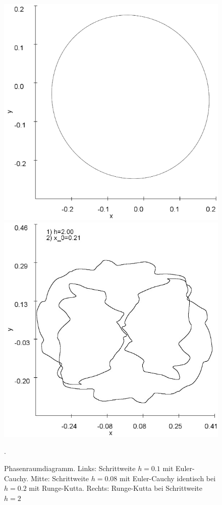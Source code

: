 \documentclass[11,5pt, twoside]{article}
\begin{document}
\begin{figure}[!htbp]
\includegraphics[scale=0.28]{duffing-awp1-500k-nach-500k-h0,08-euler}
\includegraphics[scale=0.28]{duffing-awp1-h2-runge-kutta}
\caption{Phasenraumdiagramm. Links: Schrittweite $h=0.1$ mit Euler-Cauchy. Mitte: Schrittweite $h=0.08$ mit Euler-Cauchy identisch bei $h=0.2$ mit Runge-Kutta. Rechts: Runge-Kutta bei Schrittweite $h=2$}. 
\label{fig:duffing-awp1}
\end{figure}
\end{document}
